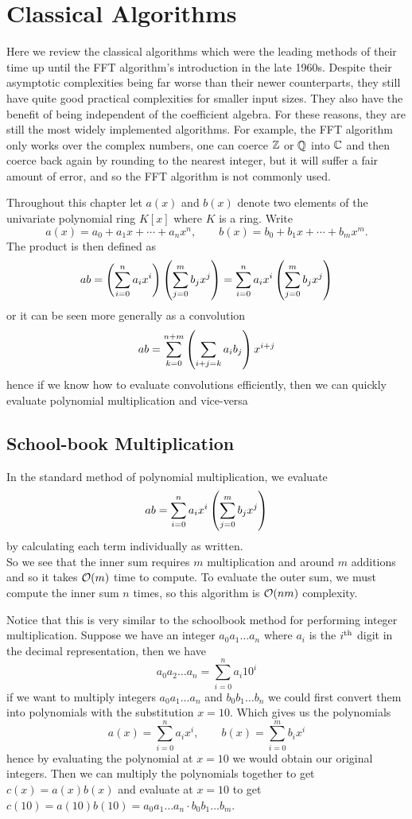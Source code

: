 \chapter{Classical Algorithms}\label{chp:classical}

Here we review the classical algorithms which were the leading methods of their time up until the FFT algorithm's introduction in the late 1960s. Despite their asymptotic complexities being far worse than their newer counterparts, they still have quite good practical complexities for smaller input sizes. They also have the benefit of being independent of the coefficient algebra. For these reasons, they are still the most widely implemented algorithms. For example, the FFT algorithm only works over the complex numbers, one can coerce ${\mathbb Z}$ or ${\mathbb Q}$ into ${\mathbb C}$ and then coerce back again by rounding to the nearest integer, but it will suffer a fair amount of error, and so the FFT algorithm is not commonly used.

Throughout this chapter let $a(x)$ and $b(x)$ denote two elements of the univariate polynomial ring $K[x]$ where $K$ is a ring.
Write
\[
    a(x) = a_0 + a_1x + \cdots + a_nx^n, \qquad b(x) = b_0 + b_1x + \cdots + b_mx^m.
\]
The product is then defined as
\[
    ab = \left(\sum^n_{i=0} a_i x^i\right)\left(\sum^m_{j=0} b_j x^j\right) = \sum^n_{i=0} a_ix^i\left(\sum^m_{j=0} b_j x^j\right)
\]
or it can be seen more generally as a convolution
\[
    ab = \sum^{n + m}_{k=0} \left(\sum_{i + j = k}a_ib_j\right) x^{i + j}
\]
hence if we know how to evaluate convolutions efficiently, then we can quickly evaluate polynomial multiplication and vice-versa

\section{School-book Multiplication}
\label{sec:prelim-schoolbook}

In the standard method of polynomial multiplication, we evaluate
\[
    ab = \sum^n_{i=0} a_ix^i\left(\sum^m_{j=0} b_j x^j\right)
\]
by calculating each term individually as written.\\
So we see that the inner sum requires $m$ multiplication and around $m$ additions and so it takes $\mathcal O(m)$ time to compute. To evaluate the outer sum, we must compute the inner sum $n$ times, so this algorithm is $\mathcal O(nm)$ complexity.

Notice that this is very similar to the schoolbook method for performing integer multiplication. Suppose we have an integer $a_0a_1 \ldots a_n$ where $a_i$ is the $i^\textrm{th}$ digit in the decimal representation, then we have
\[
    a_0a_2 \ldots a_n = \sum^n_{i=0} a_i 10^i
\]
if we want to multiply integers $a_0a_1\ldots a_n$ and $b_0b_1\ldots b_n$ we could first convert them into polynomials with the substitution $x = 10$. Which gives us the polynomials
\[
    a(x) = \sum^n_{i=0} a_ix^i, \qquad b(x) = \sum^m_{i=0} b_ix^i
\]
hence by evaluating the polynomial at $x = 10$ we would obtain our original integers. Then we can multiply the polynomials together to get $c(x) = a(x)b(x)$ and evaluate at $x = 10$ to get $c(10) = a(10)b(10) = a_0a_1\ldots a_n \cdot b_0b_1\ldots b_m$.

